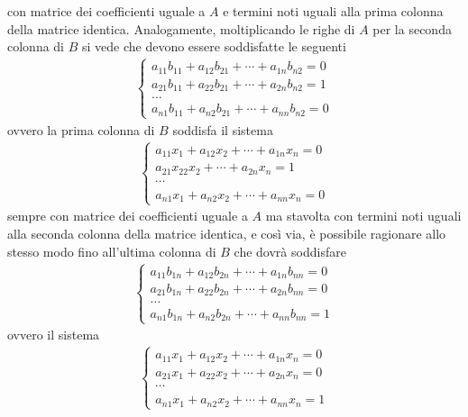 \documentclass{book}
\theoremstyle{definition}
\theoremstyle{plain}
\begin{document}
con matrice dei coefficienti uguale a $A$ e termini noti uguali alla
prima colonna della matrice identica. Analogamente, moltiplicando
le righe di $A$ per la seconda colonna di $B$ si vede che devono
essere soddisfatte le seguenti
\begin{eqnarray*}
  \begin{cases}
    a_{11}b_{11} +a_{12}b_{21}+\cdots + a_{1n}b_{n2}=0\\
    a_{21}b_{11} +a_{22}b_{21}+\cdots + a_{2n}b_{n2}=1\\
    \dots\\
    a_{n1}b_{11}+a_{n2}b_{21}+\cdots + a_{nn}b_{n2}=0
  \end{cases}
\end{eqnarray*}
ovvero la prima colonna di $B$ soddisfa il sistema
\begin{eqnarray}
  \label{eq:Compinveeproddimatrici10}
  \begin{cases}
    a_{11}x_1+a_{12}x_2+\cdots+a_{1n}x_n=0\\
    a_{21}x_{22}x_2+\cdots +a_{2n}x_n=1\\
    \cdots\\
    a_{n1}x_1+a_{n2}x_2+\cdots+a_{nn}x_n=0
  \end{cases}
\end{eqnarray}
sempre con matrice dei coefficienti uguale a $A$ ma stavolta con
termini noti uguali alla seconda colonna della matrice identica,
e così via, è possibile ragionare allo stesso modo fino all'ultima
colonna di $B$ che dovrà soddisfare
\begin{eqnarray*}
  \begin{cases}
    a_{11}b_{1n}+a_{12}b_{2n}+\cdots +a_{1n}b_{nn}=0\\
    a_{21}b_{1n}+a_{22}b_{2n}+\cdots+a_{2n}b_{nn}=0\\
    \dots\\
    a_{n1}b_{1n}+a_{n2}b_{2n}+\cdots+a_{nn}b_{nn}=1
  \end{cases}
\end{eqnarray*}
ovvero il sistema
\begin{eqnarray}
  \label{eq:Compinveeproddimatrici11}
  \begin{cases}
    a_{11}x_1+a_{12}x_2+\cdots+a_{1n}x_n=0\\
  a_{21}x_1+a_{22}x_2+\cdots+a_{2n}x_n=0\\
  \cdots\\
  a_{n1}x_1+a_{n2}x_2+\cdots+a_{nn}x_n=1
  \end{cases}
\end{eqnarray}
\end{document}
